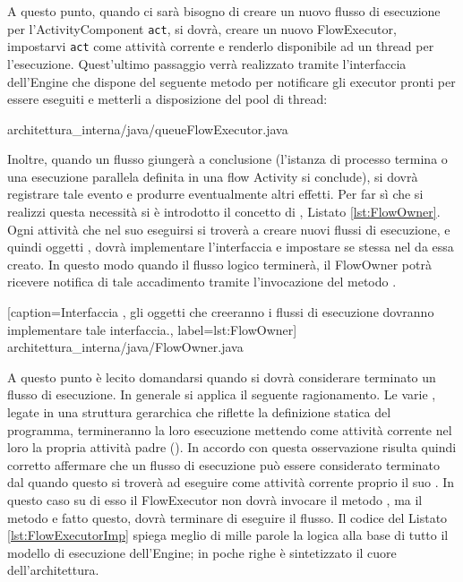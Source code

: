 A questo punto, quando ci sarà bisogno di creare un nuovo flusso di esecuzione
per l'ActivityComponent \texttt{act}, si dovrà, creare un nuovo FlowExecutor,
impostarvi \texttt{act} come attività corrente e renderlo disponibile ad un thread per
l'esecuzione. Quest'ultimo passaggio verrà realizzato tramite l'interfaccia
dell'Engine che dispone del seguente metodo per notificare gli executor pronti
per essere eseguiti e metterli a disposizione del pool di thread:

 {architettura_interna/java/queueFlowExecutor.java}

Inoltre, quando un flusso giungerà a conclusione (l'istanza di processo termina
o una esecuzione parallela definita in una flow Activity si conclude), si dovrà
registrare tale evento e produrre eventualmente altri effetti. Per far sì che si
realizzi questa necessità si \`e introdotto il concetto di ,
Listato \ref{lst:FlowOwner}. Ogni attività che nel suo eseguirsi si
troverà a creare nuovi flussi di esecuzione, e quindi oggetti ,  dovrà implementare
l'interfaccia  e impostare se stessa nel 
da essa creato. In questo modo quando il flusso logico terminerà, il FlowOwner potrà
ricevere notifica di tale accadimento tramite l'invocazione del metodo
.


[caption={Interfaccia , gli oggetti che creeranno i flussi di
esecuzione dovranno implementare tale interfaccia.}, label=lst:FlowOwner]
{architettura_interna/java/FlowOwner.java}

A questo punto \`e lecito domandarsi quando si dovrà considerare terminato un
flusso di esecuzione. In generale si applica il seguente ragionamento. Le varie
, legate in una struttura gerarchica che
riflette la definizione statica del programma, termineranno la loro esecuzione
mettendo come attività corrente nel loro  la propria attività
padre (). In accordo con questa osservazione risulta
quindi corretto affermare che un flusso di esecuzione può essere considerato
terminato dal  quando questo si troverà ad eseguire come
attività corrente proprio il suo . In questo caso su di esso il
FlowExecutor non dovrà invocare il metodo , ma il metodo
 e fatto questo, dovrà terminare di eseguire il flusso. Il
codice del Listato \ref{lst:FlowExecutorImp} spiega meglio di mille parole la
logica alla base di tutto il modello di esecuzione dell'Engine; in poche righe \`e sintetizzato il cuore
dell'architettura.

